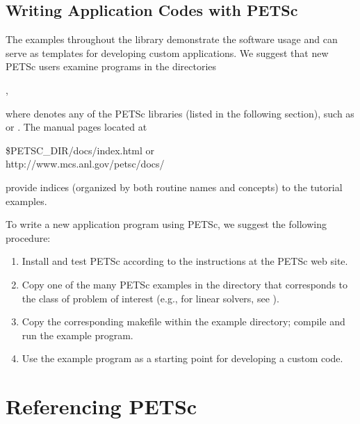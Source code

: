 \subsection*{Writing Application Codes with PETSc}

The examples throughout the library demonstrate the software usage
and can serve as templates for developing
custom applications.  We suggest that new PETSc
users examine programs in the directories 
\begin{tabbing}
  ,
\end{tabbing}
where 
denotes any of the PETSc libraries (listed in the following
section), such as  or .  
The manual pages located at
\begin{tabbing}
   \${PETSC\_DIR}/docs/index.html or \\
   http://www.mcs.anl.gov/petsc/docs/
\end{tabbing}
provide indices (organized by both routine names and concepts) to the tutorial examples.

To write a new application program using PETSc, we suggest the
following procedure:
\begin{enumerate}
\item Install and test PETSc according to the instructions at the PETSc web site.
\item Copy one of the many PETSc examples in the directory
      that corresponds to the class of problem of interest (e.g.,
      for linear solvers, see ).
\item Copy the corresponding makefile within the example directory;
      compile and run the example program.
\item Use the example program as a starting point for developing a custom code.
\end{enumerate}


\section{Referencing PETSc}

